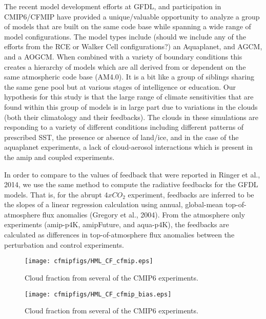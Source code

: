 \documentclass[11pt]{article}   	%
\begin{document}
The recent model development efforts at GFDL, and participation in CMIP6/CFMIP have provided a 
unique/valuable opportunity to analyze a group of models that are built on the same code base while 
spanning a wide range of model configurations.  The model types include (should we include any of the
efforts from the RCE or Walker Cell configurations?) an Aquaplanet, and AGCM, 
and a AOGCM.  When combined with a variety of boundary conditions this creates a hierarchy of
models which are all derived from or dependent on the same atmospheric code base (AM4.0).  It is a 
bit like a group of siblings sharing the same gene pool but at various stages of intelligence or education.      
Our hypothesis for this study is that the large range of climate sensitivities that are found within this 
group of models is in large part due to variations in the clouds (both their climatology and their feedbacks).
The clouds in these simulations are responding to a variety of different conditions including different
patterns of prescribed SST, the presence or absence of land/ice, and in the case of the aquaplanet
experiments, a lack of cloud-aerosol interactions which is present in the amip and coupled experiments.  

In order to compare to the values of feedback that were reported in Ringer et al., 2014, we use the same method 
to compute the radiative feedbacks for the GFDL models.  That is, for the abrupt $4xCO_{2}$ experiment, feedbacks are 
inferred to be the slopes of a linear regression calculation using annual, global-mean top-of-atmosphere flux anomalies 
(Gregory et al., 2004).  From the atmosphere only experiments (amip-p4K, amipFuture, and aqua-p4K), the feedbacks 
are calculated as 
differences in top-of-atmosphere flux anomalies between the perturbation and control experiments.   

\begin{figure}
  \texttt{[image: cfmipfigs/HML\_CF\_cfmip.eps]}
  \caption{Cloud fraction from several of the CMIP6 experiments.}
  \label{fig:cf_hml_manyexps}
\end{figure}

\begin{figure}
  \texttt{[image: cfmipfigs/HML\_CF\_cfmip\_bias.eps]}
  \caption{Cloud fraction from several of the CMIP6 experiments.}
  \label{fig:cf_hml_bias}
\end{figure}
\end{document}
